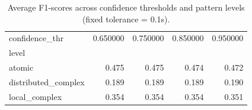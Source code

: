 \begin{table}[H]
\centering
\begin{table}
\caption{Average F1-scores across confidence thresholds and pattern levels (fixed tolerance = 0.1s).}
\label{tab:f1_confidence_summary_t1}
\begin{tabular}{lrrrr}
\toprule
confidence_thr & 0.650000 & 0.750000 & 0.850000 & 0.950000 \\
level &  &  &  &  \\
\midrule
atomic & 0.475 & 0.475 & 0.474 & 0.472 \\
distributed_complex & 0.189 & 0.189 & 0.189 & 0.190 \\
local_complex & 0.354 & 0.354 & 0.354 & 0.351 \\
\bottomrule
\end{tabular}
\end{table}
\end{table}
